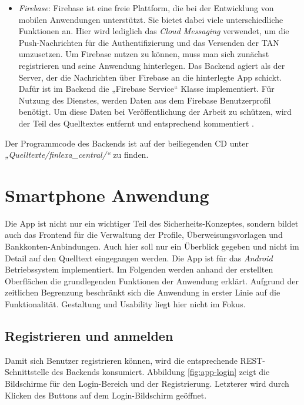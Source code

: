 \begin{itemize}
    \item \textit{Firebase}: Firebase ist eine freie Plattform, die bei der Entwicklung von mobilen Anwendungen unterstützt. Sie bietet dabei viele unterschiedliche Funktionen an. Hier wird lediglich das \textit{Cloud Messaging} verwendet, um die Push-Nachrichten für die Authentifizierung und das Versenden der \ac{TAN} umzusetzen. Um Firebase nutzen zu können, muss man sich zunächst registrieren und seine Anwendung hinterlegen. Das Backend agiert als der Server, der die Nachrichten über Firebase an die hinterlegte App schickt. Dafür ist im Backend die „Firebase Service“ Klasse implementiert. Für Nutzung des Dienstes, werden Daten aus dem Firebase Benutzerprofil benötigt. Um diese Daten bei Veröffentlichung der Arbeit zu schützen, wird der Teil des Quelltextes entfernt und entsprechend kommentiert \cite{firebase}.
\end{itemize}

Der Programmcode des Backends ist auf der beiliegenden CD unter \textit{„Quelltexte/finlexa\_central/“} zu finden.

\section{Smartphone Anwendung}
\label{sec:app}
Die App ist nicht nur ein wichtiger Teil des Sicherheits-Konzeptes, sondern bildet auch das Frontend für die Verwaltung der Profile, Überweisungsvorlagen und Bankkonten-Anbindungen. Auch hier soll nur ein Überblick gegeben und nicht im Detail auf den Quelltext eingegangen werden. Die App ist für das \textit{Android} Betriebssystem \cite{android} implementiert. Im Folgenden werden anhand der erstellten Oberflächen die grundlegenden Funktionen der Anwendung erklärt. Aufgrund der zeitlichen Begrenzung beschränkt sich die Anwendung in erster Linie auf die Funktionalität. Gestaltung und Usability liegt hier nicht im Fokus.

\subsection{Registrieren und anmelden}
\label{subsec:app-registrieren-anmelden}
Damit sich Benutzer registrieren können, wird die entsprechende \ac{REST}-Schnittstelle des Backends konsumiert. Abbildung \ref{fig:app-login} zeigt die Bildschirme für den Login-Bereich und der Registrierung. Letzterer wird durch Klicken des Buttons auf dem Login-Bildschirm geöffnet.

